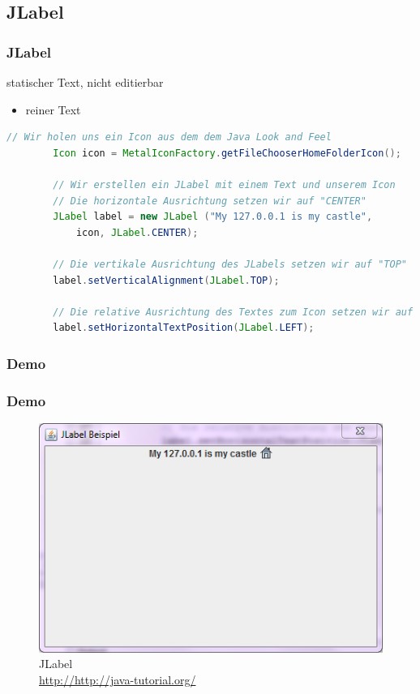 \documentclass[xcolor=dvipsnames]{beamer}
\begin{document}
\subsection{JLabel}
\begin{frame} %
  \frametitle{JLabel} %
  \begin{block}{statischer Text, nicht editierbar}
	  \begin{itemize}
		\item reiner Text
	  \end{itemize}
  \end{block}

\begin{lstlisting}[language=java,basicstyle=\scriptsize\ttfamily]
// Wir holen uns ein Icon aus dem dem Java Look and Feel
        Icon icon = MetalIconFactory.getFileChooserHomeFolderIcon();
 
        // Wir erstellen ein JLabel mit einem Text und unserem Icon
        // Die horizontale Ausrichtung setzen wir auf "CENTER"
        JLabel label = new JLabel ("My 127.0.0.1 is my castle", 
            icon, JLabel.CENTER);
 
        // Die vertikale Ausrichtung des JLabels setzen wir auf "TOP"
        label.setVerticalAlignment(JLabel.TOP);
 
        // Die relative Ausrichtung des Textes zum Icon setzen wir auf "LEFT"
        label.setHorizontalTextPosition(JLabel.LEFT);	
\end{lstlisting}

 

  

\end{frame}

\subsubsection{Demo}
\begin{frame}
  \frametitle{Demo}
	\begin{figure}
		\includegraphics[scale=0.8]{images/jlabel.PNG}
		\caption{JLabel \\ \tiny{\textcolor{gray}{\url{http://http://java-tutorial.org/}}}}
		\end{figure}
\end{frame}
\end{document}
